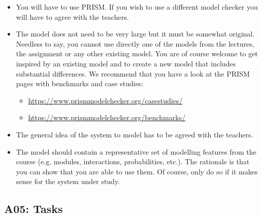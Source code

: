 \documentclass[12pt,a4paper]{article}
\begin{document}
\begin{itemize}

\item You will have to use PRISM. If you wish to use a different model checker you will have to agree with the teachers.

\item The model does not need to be very large but it must be somewhat original. Needless to say, you cannot use directly one of the models from the lectures, the assignment or any other existing model. You are of course welcome to get inspired by an existing model and to create a new model that includes substantial differences.  We recommend that you have a look at the PRISM pages with benchmarks and case studies:
\begin{itemize}
\item \url{https://www.prismmodelchecker.org/casestudies/}
\item \url{https://www.prismmodelchecker.org/benchmarks/}
\end{itemize}

\item The general idea of the system to model has to be agreed with the teachers.

\item The model should contain a representative set of modelling features from the course (e.g. modules, interactions, probabilities, etc.). The rationale is that you can show that you are able to use them. Of course, only do so if it makes sense for the system under study.

\end{itemize}
%

\subsection*{A05: Tasks}
\end{document}
